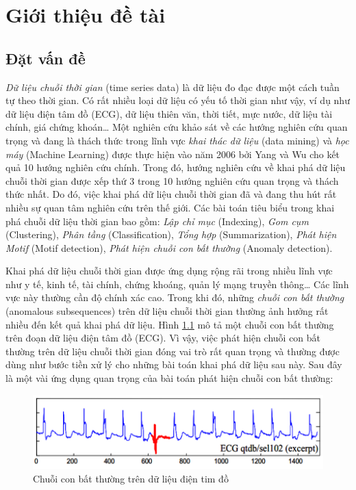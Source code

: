 \chapter{Giới thiệu đề tài}
\section{Đặt vấn đề}
\textit{Dữ liệu chuỗi thời gian} (time series data) là dữ liệu đo đạc được một cách tuần tự theo thời gian. Có rất nhiều loại dữ liệu có yếu tố thời gian như vậy, ví dụ như dữ liệu điện tâm đồ (ECG), dữ liệu thiên văn, thời tiết, mực nước, dữ liệu tài chính, giá chứng khoán… Một nghiên cứu khảo sát về các hướng nghiên cứu quan trọng và đang là thách thức trong lĩnh vực \textit{khai thác dữ liệu} (data mining) và \textit{học máy} (Machine Learning) được thực hiện vào năm 2006 bởi Yang và Wu \cite{st1} cho kết quả 10 hướng nghiên cứu chính. Trong đó, hướng nghiên cứu về khai phá dữ liệu chuỗi thời gian được xếp thứ 3 trong 10 hướng nghiên cứu quan trọng và thách thức nhất. Do đó, việc khai phá dữ liệu chuỗi thời gian đã và đang thu hút rất nhiều sự quan tâm nghiên cứu trên thế giới. Các bài toán tiêu biểu trong khai phá chuỗi dữ liệu thời gian bao gồm: \textit{Lập chỉ mục} (Indexing), \textit{Gom cụm} (Clustering), \textit{Phân tầng} (Classification), \textit{Tổng hợp} (Summarization), \textit{Phát hiện Motif} (Motif detection), \textit{Phát hiện chuỗi con bất thường} (Anomaly detection).

Khai phá dữ liệu chuỗi thời gian được ứng dụng rộng rãi trong nhiều lĩnh vực như y tế, kinh tế, tài chính, chứng khoáng, quản lý mạng truyền thông… Các lĩnh vực này thường cần độ chính xác cao. Trong khi đó, những \textit{chuỗi con bất thường} (anomalous subsequences) trên dữ liệu chuỗi thời gian thường ảnh hưởng rất nhiều đến kết quả khai phá dữ liệu. Hình \ref{fig:1-1} mô tả một chuỗi con bất thường trên đoạn dữ liệu điện tâm đồ (ECG).  Vì vậy, việc phát hiện chuỗi con bất thường trên dữ liệu chuỗi thời gian đóng vai trò rất quan trọng và thường được dùng như bước tiền xử lý cho những bài toán khai phá dữ liệu sau này. Sau đây là một vài ứng dụng quan trọng của bài toán phát hiện chuỗi con bất thường:

\begin{figure}[H]
    \centering
    \includegraphics[scale=0.75]{./content/images/1-1.png}
    \caption{Chuỗi con bất thường trên dữ liệu điện tim đồ \cite{st12}}
    \label{fig:1-1}
\end{figure}

